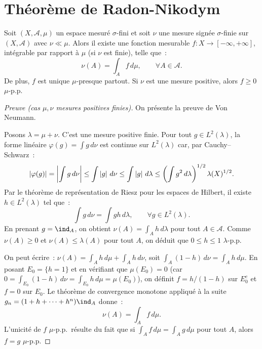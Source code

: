 \section{Th\'eor\`eme de Radon-Nikodym}

\begin{theoreme}
\label{thm:radon_nikodym}
Soit $(X, \mathcal{A}, \mu)$ un espace mesur\'e $\sigma$-fini et soit $\nu$ une
mesure sign\'ee $\sigma$-finie sur $(X, \mathcal{A})$ avec $\nu \ll \mu$. Alors il
existe une fonction mesurable $f : X \to [-\infty, +\infty]$, int\'egrable par rapport
\`a $\mu$ (si $\nu$ est finie), telle que~:
\[
    \nu(A) = \int_A f\, d\mu, \qquad \forall A \in \mathcal{A}.
\]
De plus, $f$ est unique $\mu$-presque partout. Si $\nu$ est une mesure positive,
alors $f \geq 0$ $\mu$-p.p.
\end{theoreme}

\begin{proof}[Preuve (cas $\mu, \nu$ mesures positives finies)]
On pr\'esente la preuve de Von Neumann.

Posons $\lambda = \mu + \nu$. C'est une mesure positive finie. Pour tout
$g \in L^2(\lambda)$, la forme lin\'eaire
$\varphi(g) = \int g\, d\nu$ est continue sur $L^2(\lambda)$ car, par
Cauchy--Schwarz~:
\[
    \left| \varphi(g) \right| = \left|\int g\, d\nu\right| \leq \int \left| g \right|\, d\nu
    \leq \int \left| g \right|\, d\lambda
    \leq \left(\int g^2\, d\lambda\right)^{1/2} \lambda(X)^{1/2}.
\]
Par le th\'eor\`eme de repr\'esentation de Riesz pour les espaces de Hilbert, il
existe $h \in L^2(\lambda)$ tel que~:
\[
    \int g\, d\nu = \int gh\, d\lambda, \qquad \forall g \in L^2(\lambda).
\]
En prenant $g = \ind_A$, on obtient $\nu(A) = \int_A h\, d\lambda$ pour tout
$A \in \mathcal{A}$. Comme $\nu(A) \geq 0$ et $\nu(A) \leq \lambda(A)$ pour tout $A$,
on d\'eduit que $0 \leq h \leq 1$ $\lambda$-p.p.

On peut \'ecrire~: $\nu(A) = \int_A h\, d\mu + \int_A h\, d\nu$, soit
$\int_A (1-h)\, d\nu = \int_A h\, d\mu$. En posant
$E_0 = \{h = 1\}$ et en v\'erifiant que $\mu(E_0) = 0$ (car
$0 = \int_{E_0}(1-h)\, d\nu = \int_{E_0} h\, d\mu = \mu(E_0)$), on d\'efinit
$f = h/(1-h)$ sur $E_0^c$ et $f = 0$ sur $E_0$. Le th\'eor\`eme de convergence
monotone appliqu\'e \`a la suite $g_n = (1 + h + \cdots + h^n) \ind_A$ donne~:
\[
    \nu(A) = \int_A f\, d\mu.
\]
L'unicit\'e de $f$ $\mu$-p.p.\ r\'esulte du fait que si $\int_A f\, d\mu = \int_A g\, d\mu$
pour tout $A$, alors $f = g$ $\mu$-p.p.
\end{proof}

